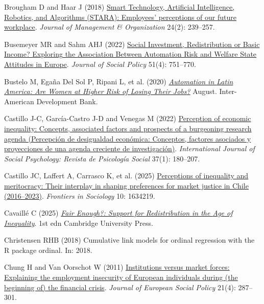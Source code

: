 \documentclass[
  12pt,
]{article}
\newlength{\cslhangindent}
\newenvironment{CSLReferences}[2] %
 {\begin{list}{}{%
  \setlength{\itemindent}{0pt}
  \setlength{\leftmargin}{0pt}
  \setlength{\parsep}{0pt}
  \ifodd #1
   \setlength{\leftmargin}{\cslhangindent}
   \setlength{\itemindent}{-1\cslhangindent}
  \fi
  \setlength{\itemsep}{#2\baselineskip}}}
 {\end{list}}
\begin{document}
\begin{CSLReferences}{1}{1}
Brougham D and Haar J (2018)
\href{https://doi.org/10.1017/jmo.2016.55}{Smart {Technology},
{Artificial Intelligence}, {Robotics}, and {Algorithms} ({STARA}):
{Employees}' perceptions of our future workplace}. \emph{Journal of
Management \& Organization} 24(2): 239--257.

Busemeyer MR and Sahm AHJ (2022)
\href{https://doi.org/10.1017/S0047279421000519}{Social {Investment},
{Redistribution} or {Basic Income}? {Exploring} the {Association Between
Automation Risk} and {Welfare State Attitudes} in {Europe}}.
\emph{Journal of Social Policy} 51(4): 751--770.

Bustelo M, Egaña Del Sol P, Ripani L, et al. (2020)
\emph{\href{https://doi.org/10.18235/0002566}{Automation in {Latin
America}: {Are Women} at {Higher Risk} of {Losing Their Jobs}?}} August.
Inter-American Development Bank.

Castillo J-C, García-Castro J-D and Venegas M (2022)
\href{https://doi.org/10.1080/02134748.2021.2009275}{Perception of
economic inequality: Concepts, associated factors and prospects of a
burgeoning research agenda ({Percepción} de desigualdad económica:
Conceptos, factores asociados y proyecciones de una agenda creciente de
investigación)}. \emph{International Journal of Social Psychology:
Revista de Psicología Social} 37(1): 180--207.

Castillo JC, Laffert A, Carrasco K, et al. (2025)
\href{https://doi.org/10.3389/fsoc.2025.1634219}{Perceptions of
inequality and meritocracy: Their interplay in shaping preferences for
market justice in {Chile} (2016--2023)}. \emph{Frontiers in Sociology}
10: 1634219.

Cavaillé C (2025)
\emph{\href{https://doi.org/10.1017/9781009366038}{Fair {Enough}?:
{Support} for {Redistribution} in the {Age} of {Inequality}}}. 1st edn
Cambridge University Press.

Christensen RHB (2018) Cumulative link models for ordinal regression
with the {R} package ordinal. In: 2018.

Chung H and Van Oorschot W (2011)
\href{https://doi.org/10.1177/0958928711412224}{Institutions versus
market forces: {Explaining} the employment insecurity of {European}
individuals during (the beginning of) the financial crisis}.
\emph{Journal of European Social Policy} 21(4): 287--301.


\end{CSLReferences}
\end{document}
